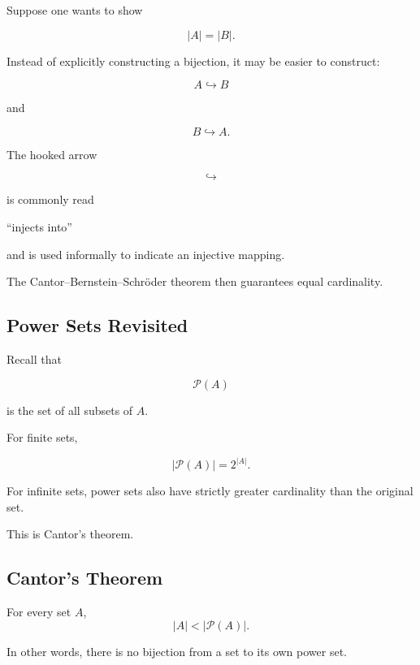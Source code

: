 Suppose one wants to show

\[ |A|=|B|. \]

Instead of explicitly constructing a bijection, it may be easier to construct:

\[ A\hookrightarrow B \]

and

\[ B\hookrightarrow A. \]

The hooked arrow

\[ \hookrightarrow \]

is commonly read

\begin{center}
``injects into''
\end{center}

and is used informally to indicate an injective mapping.

The Cantor--Bernstein--Schröder theorem then guarantees equal cardinality.

\subsection{Power Sets Revisited}
\label{subsec:power-sets-cardinality}

Recall that

\[ \mathcal P(A) \]

is the set of all subsets of \(A\).

For finite sets,

\[ |\mathcal P(A)|=2^{|A|}. \]

For infinite sets, power sets also have strictly greater cardinality than the
original set.

This is Cantor's theorem.

\subsection{Cantor's Theorem}
\label{subsec:cantor-theorem}

\begin{theorem}
For every set \(A\),
\[ |A|<|\mathcal P(A)|. \]
\end{theorem}

In other words, there is no bijection from a set to its own power set.

